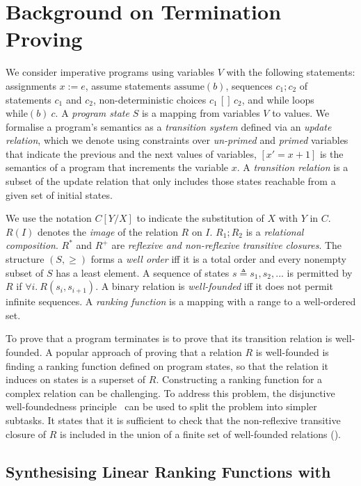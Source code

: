 \section{Background on Termination Proving}
\label{sec:background}

We consider imperative programs using variables $V$ with the following statements: assignments $x:=e$, assume statements $\mathrm{assume}(b)$, sequences $c_1; c_2$ of statements $c_1$ and $c_2$, non-deterministic choices $c_1\,[]\,c_2$, and while loops $\mathrm{while}(b)\ c$. A \emph{program state} $S$ is a mapping from variables $V$ to values. We formalise a program's semantics as a \emph{transition system} defined via an \emph{update relation}, which we denote using constraints over \emph{un-primed} and \emph{primed} variables that indicate the previous and the next values of variables, \eg $[x' = x + 1]$ is the semantics of a program that increments the variable $x$. A \emph{transition relation} is a subset of the update relation that only includes those states reachable from a given set of initial states.

We use the notation $C[Y/X]$ to indicate the substitution of $X$ with $Y$ in $C$. $R(I)$ denotes the \emph{image} of the relation $R$ on $I$. $R_1; R_2$ is a \emph{relational composition}. $R^*$ and $R^+$ are \emph{reflexive and non-reflexive transitive closures}. The structure $(S, \ge)$ forms a \emph{well order} iff it is a total order and every nonempty subset of $S$ has a least element. A sequence of states $s \triangleq s_1, s_2, ...$ is permitted by $R$ if $\forall i.\ R(s_i, s_{i+1})$. A binary relation is \emph{well-founded} iff it does not permit infinite sequences. A \emph{ranking function} is a mapping with a range to a well-ordered set.

To prove that a program terminates is to prove that its transition relation is well-founded. A popular approach of proving that a relation $R$ is well-founded is finding a ranking function defined on program states, so that the relation it induces on states is a superset of $R$. Constructing a ranking function for a complex relation can be challenging. To address this problem, the disjunctive well-foundedness principle~\cite{podelski2004Ti} can be used to split the problem into simpler subtasks. It states that it is sufficient to check that the non-reflexive transitive closure of $R$ is included in the union of a finite set of well-founded relations ().

\subsection{Synthesising Linear Ranking Functions with \rfs}
\label{sec:rfs}

